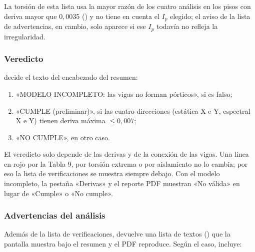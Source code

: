 La torsión de esta lista usa la mayor razón de los cuatro análisis en los pisos con deriva mayor que $0{,}0035$
() y no tiene en cuenta el $I_p$ elegido; el aviso de la lista de advertencias,
en cambio, solo aparece si ese $I_p$ todavía no refleja la irregularidad.

\subsubsection{Veredicto}

 decide el texto del encabezado del resumen:

\begin{enumerate}
	\item «MODELO INCOMPLETO: las vigas no forman pórticos», si  es falso;
	\item «CUMPLE (preliminar)», si las cuatro direcciones (estática X e Y, espectral X e Y) tienen deriva máxima
	      $\le 0{,}007$;
	\item «NO CUMPLE», en otro caso.
\end{enumerate}

El veredicto solo depende de las derivas y de la conexión de las vigas. Una línea en rojo por la Tabla 9, por torsión
extrema o por aislamiento no lo cambia; por eso la lista de verificaciones se muestra siempre debajo. Con el modelo
incompleto, la pestaña «Derivas» y el reporte PDF muestran «No válida» en lugar de «Cumple» o «No cumple».

\subsubsection{Advertencias del análisis}
\label{sec:sis-advertencias}

Además de la lista de verificaciones,  devuelve una lista de textos
() que la pantalla muestra bajo el resumen y el PDF reproduce. Según el caso, incluye:

